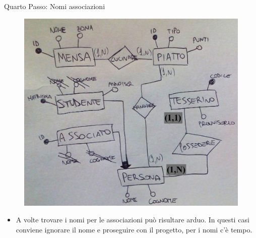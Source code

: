 \begin{frame}{Quarto Passo: Nomi associazioni}
\begin{minipage}[t]{0.6\linewidth}
\vspace{-1cm}
    \begin{figure}
        \centering
        \includegraphics[width=.9\textwidth]{img/er-dopo-quarto-passo.png}
    \end{figure}
\end{minipage}%
\hfill%
\begin{minipage}[t]{0.35\linewidth}
\vspace{.3cm}
\begin{itemize}[<+->]
    \item A volte trovare i nomi per le associazioni pu\`o risultare arduo. In questi casi conviene ignorare il nome e proseguire con il progetto, per i nomi c'\`e tempo.
\end{itemize}
\end{minipage}
\end{frame}
%
